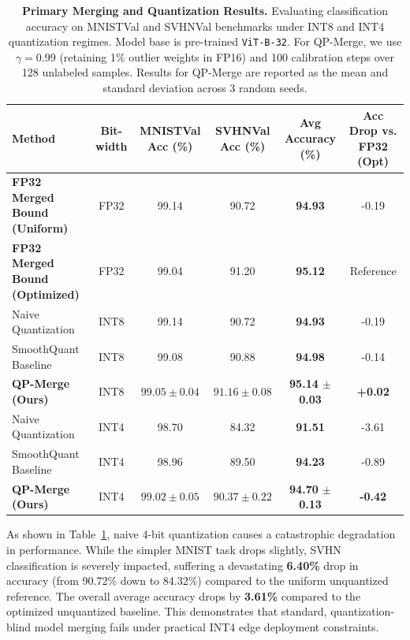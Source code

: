 \begin{table}[t]
\caption{\textbf{Primary Merging and Quantization Results.} Evaluating classification accuracy on MNISTVal and SVHNVal benchmarks under INT8 and INT4 quantization regimes. Model base is pre-trained \texttt{ViT-B-32}. For QP-Merge, we use $\gamma = 0.99$ (retaining 1\% outlier weights in FP16) and 100 calibration steps over 128 unlabeled samples. Results for QP-Merge are reported as the mean and standard deviation across 3 random seeds.}
\label{tab:primary_results}
\vskip 0.15in
\begin{center}
\begin{small}
\begin{sc}
\begin{tabular}{lccccc}
\toprule
Method & Bit-width & MNISTVal Acc (\%) & SVHNVal Acc (\%) & Avg Accuracy (\%) & Acc Drop vs. FP32 (Opt) \\
\midrule
\textbf{FP32 Merged Bound (Uniform)} & FP32 & 99.14 & 90.72 & \textbf{94.93} & -0.19 \\
\textbf{FP32 Merged Bound (Optimized)} & FP32 & 99.04 & 91.20 & \textbf{95.12} & Reference \\
\midrule
Naive Quantization & INT8 & 99.14 & 90.72 & \textbf{94.93} & -0.19 \\
SmoothQuant Baseline & INT8 & 99.08 & 90.88 & \textbf{94.98} & -0.14 \\
\textbf{QP-Merge (Ours)} & INT8 & $99.05 \pm 0.04$ & $91.16 \pm 0.08$ & \textbf{95.14 $\pm$ 0.03} & \textbf{+0.02} \\
\midrule
Naive Quantization & INT4 & 98.70 & 84.32 & \textbf{91.51} & -3.61 \\
SmoothQuant Baseline & INT4 & 98.96 & 89.50 & \textbf{94.23} & -0.89 \\
\textbf{QP-Merge (Ours)} & INT4 & $99.02 \pm 0.05$ & $90.37 \pm 0.22$ & \textbf{94.70 $\pm$ 0.13} & \textbf{-0.42} \\
\bottomrule
\end{tabular}
\end{sc}
\end{small}
\end{center}
\vskip -0.1in
\end{table}

As shown in Table~\ref{tab:primary_results}, naive 4-bit quantization causes a catastrophic degradation in performance. While the simpler MNIST task drops slightly, SVHN classification is severely impacted, suffering a devastating \textbf{6.40\%} drop in accuracy (from 90.72\% down to 84.32\%) compared to the uniform unquantized reference. The overall average accuracy drops by \textbf{3.61\%} compared to the optimized unquantized baseline. This demonstrates that standard, quantization-blind model merging fails under practical INT4 edge deployment constraints.

